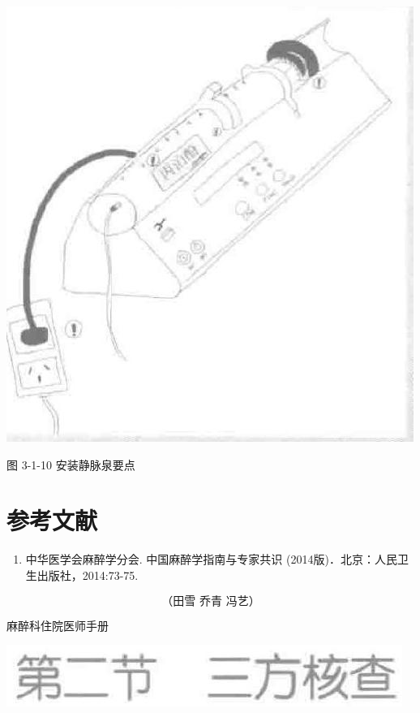 \documentclass[10pt]{article}
\begin{document}
\begin{center}
\includegraphics[max width=\textwidth]{2024_07_05_645bb794a4d4f32ee0c8g-079}
\end{center}

图 3-1-10 安装静脉泉要点

\section*{参考文献}
\begin{enumerate}
  \item 中华医学会麻醉学分会. 中国麻醉学指南与专家共识 (2014版)．北京：人民卫生出版社，2014:73-75.
\end{enumerate}

\[
\text { （田雪 乔青 冯艺） }
\]

麻醉科住院医师手册

\begin{center}
\includegraphics[max width=\textwidth]{2024_07_05_645bb794a4d4f32ee0c8g-080(19)}
\end{center}
\end{document}
